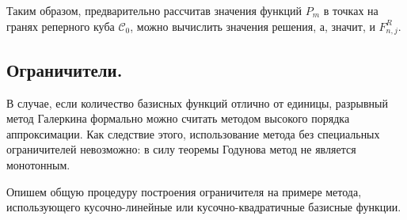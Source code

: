 \documentclass[14pt, a4paper, fleqn]{extreport}
\begin{document}
    Таким образом, предварительно рассчитав значения функций $P_m$
    в точках на гранях реперного куба $\mathcal{C}_0$, можно вычислить значения решения,
    а, значит, и $F_{n,j}^R$.
    
    \subsection{Ограничители.}

    В случае, если количество базисных функций отлично от единицы, 
    разрывный метод Галеркина формально можно считать методом высокого порядка аппроксимации.
    Как следствие этого, использование метода без специальных ограничителей невозможно:
    в силу теоремы Годунова метод не является монотонным.
    
    Опишем общую процедуру построения ограничителя на примере метода,
    использующего кусочно-линейные или кусочно-квадратичные базисные функции.
    
\end{document}
